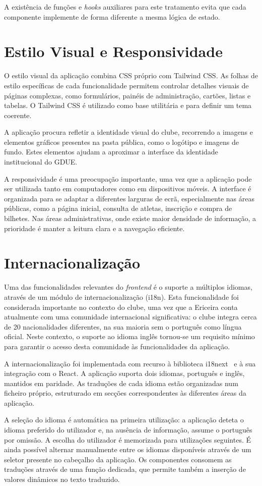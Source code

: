 A existência de funções e \textit{hooks} auxiliares para este tratamento evita
que cada componente implemente de forma diferente a mesma lógica de estado.

\section{Estilo Visual e Responsividade}

O estilo visual da aplicação combina CSS próprio com Tailwind CSS. As folhas de
estilo específicas de cada funcionalidade permitem controlar detalhes visuais
de páginas complexas, como formulários, painéis de administração, cartões,
listas e tabelas. O Tailwind CSS é utilizado como base utilitária e para
definir um tema coerente.

A aplicação procura refletir a identidade visual do clube, recorrendo a imagens
e elementos gráficos presentes na pasta pública, como o logótipo e imagens de
fundo. Estes elementos ajudam a aproximar a interface da identidade institucional
do GDUE.

A responsividade é uma preocupação importante, uma vez que a aplicação pode ser
utilizada tanto em computadores como em dispositivos móveis. A interface é
organizada para se adaptar a diferentes larguras de ecrã, especialmente nas
áreas públicas, como a página inicial, consulta de atletas, inscrição e compra
de bilhetes. Nas áreas administrativas, onde existe maior densidade de
informação, a prioridade é manter a leitura clara e a navegação eficiente.

\section{Internacionalização}

Uma das funcionalidades relevantes do \textit{frontend} é o suporte a múltiplos
idiomas, através de um módulo de internacionalização (i18n). Esta funcionalidade
foi considerada importante no contexto do clube, uma vez que a Ericeira conta
atualmente com uma comunidade internacional significativa: o clube integra
cerca de 20 nacionalidades diferentes, na sua maioria sem o português como
língua oficial. Neste contexto, o suporte ao idioma inglês tornou-se um
requisito mínimo para garantir o acesso desta comunidade às funcionalidades da
aplicação.

A internacionalização foi implementada com recurso à biblioteca
i18next~\cite{i18next} e à sua integração com o React. A aplicação suporta dois
idiomas, português e inglês, mantidos em paridade. As traduções de cada idioma
estão organizadas num ficheiro próprio, estruturado em secções correspondentes
às diferentes áreas da aplicação.

A seleção do idioma é automática na primeira utilização: a aplicação deteta o
idioma preferido do utilizador e, na ausência de informação, assume o português
por omissão. A escolha do utilizador é memorizada para utilizações seguintes. É
ainda possível alternar manualmente entre os idiomas disponíveis através de um
seletor presente no cabeçalho da aplicação. Os componentes consomem as
traduções através de uma função dedicada, que permite também a inserção de
valores dinâmicos no texto traduzido.

